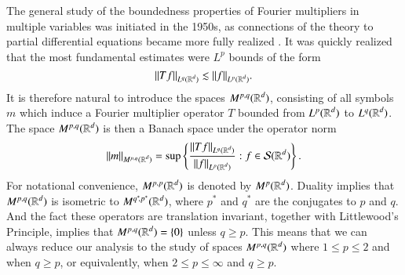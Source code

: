 The general study of the boundedness properties of Fourier multipliers in multiple variables was initiated in the 1950s, as connections of the theory to partial differential equations became more fully realized \cite{Hormander1}. It was quickly realized that the most fundamental estimates were $L^p$ bounds of the form
%
\[ \| Tf \|_{L^q(\operatorname{\mathbb{R}}^d)} \lesssim \| f \|_{L^p(\operatorname{\mathbb{R}}^d)}. \]
%
%
%
It is therefore natural to introduce the spaces $M^{p,q}(\operatorname{\mathbb{R}}^d)$, consisting of all symbols $m$ which induce a Fourier multiplier operator $T$ bounded from $L^p(\operatorname{\mathbb{R}}^d)$ to $L^q(\operatorname{\mathbb{R}}^d)$. The space $M^{p,q}(\operatorname{\mathbb{R}}^d)$ is then a Banach space under the operator norm
%
\[ \| m \|_{M^{p,q}(\operatorname{\mathbb{R}}^d)} = \sup \left\{ \frac{\| T f \|_{L^q(\operatorname{\mathbb{R}}^d)}}{\| f \|_{L^p(\operatorname{\mathbb{R}}^d)}} : f \in \mathcal{S}(\operatorname{\mathbb{R}}^d) \right\}. \]
%
For notational convenience, $M^{p,p}(\operatorname{\mathbb{R}}^d)$ is denoted by $M^p(\operatorname{\mathbb{R}}^d)$. Duality implies that $M^{p,q}(\operatorname{\mathbb{R}}^d)$ is isometric to $M^{q^* \negmedspace ,p^*}(\operatorname{\mathbb{R}}^d)$, where $p^*$ and $q^*$ are the conjugates to $p$ and $q$. And the fact these operators are translation invariant, together with Littlewood's Principle, implies that $M^{p,q}(\operatorname{\mathbb{R}}^d) = \{ 0 \}$ unless $q \geq p$. This means that we can always reduce our analysis to the study of spaces $M^{p,q}(\operatorname{\mathbb{R}}^d)$ where $1 \leq p \leq 2$ and when $q \geq p$, or equivalently, when $2 \leq p \leq \infty$ and $q \geq p$.

